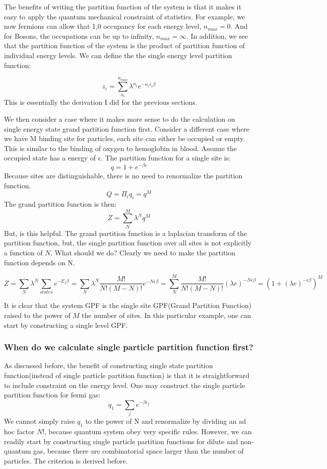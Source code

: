 \documentclass[12pt, oneside]{article}   	%
\begin{document}
The benefits of writing the partition function of the system is that it makes it easy to apply the quantum mechanical constraint of statistics. For example, we now fermions can allow that 1,0 occupancy for each energy level, $n_{max} = 0$. And for Bosons, the occupations can be up to infinity, $n_{max} = \infty$. In addition, we see that the partition function of the system is the product of partition function of individual energy levels. We can define the the single energy level partition function: 

$$z_i =  \sum_{n_i}^{n_{max}} \lambda^{n_i} e^{-n_i \epsilon_i \beta}$$ 
This is essentially the derivation I did for the previous sections. 
\par
We then consider a case where it makes more sense to do the calculation on single energy state grand partition function first. Consider a different case where we have M binding site for particles, each site can either be occupied or empty. This is similar to the binding of oxygen to hemoglobin in blood. Assume the occupied state has a energy of $\epsilon$. The partition function for a single site is: 
$$q = 1 + e^{-\beta \epsilon}$$
Because sites are distinguishable, there is no need to renormalize the partition function. 
$$Q = \Pi_i q_i = q^M$$
The grand partition function is then: 
$$Z = \sum_N^{M} \lambda^N q^M$$
But, is this helpful. The grand partition function is a laplacian transform of the partition function, but, the single partition function over all sites is not explicitly a function of $N$. What should we do? Clearly we need to make the partition function depends on N. 

$$Z = \sum_N \lambda^N \sum_{states} e^{-E_j \beta} = \sum_N \lambda^N \frac{M!}{N!(M-N)!} e^{-N \epsilon\beta} =
\sum_N^{M}  \frac{M!}{N!(M-N)!} (\lambda e)^{-N \epsilon\beta} =  (1+(\lambda e)^{-\epsilon\beta})^M$$

\par
It is clear that the system GPF is the single site GPF(Grand Partition Function) raised to the power of $M$ the number of sites. In this particular example, one can start by constructing a single level GPF. 

\subsubsection*{When do we calculate single particle partition function first?}
\par
As discussed before, the benefit of constructing single state partition function(instead of single particle partition function) is that it is straightforward to include constraint on the energy level. One may construct the single particle partition function for fermi gas: 
$$q_1 = \sum_j e^{-\beta \epsilon_j }$$
We cannot simply raise $q_1$ to the power of N and renormalize by dividing an ad hoc factor $N!$, because quantum system obey very specific rules. However, we can readily start by constructing single particle partition functions for dilute and non-quantum gas, because there are combinatorial space larger than the number of particles. The criterion is derived before. 
\end{document}
